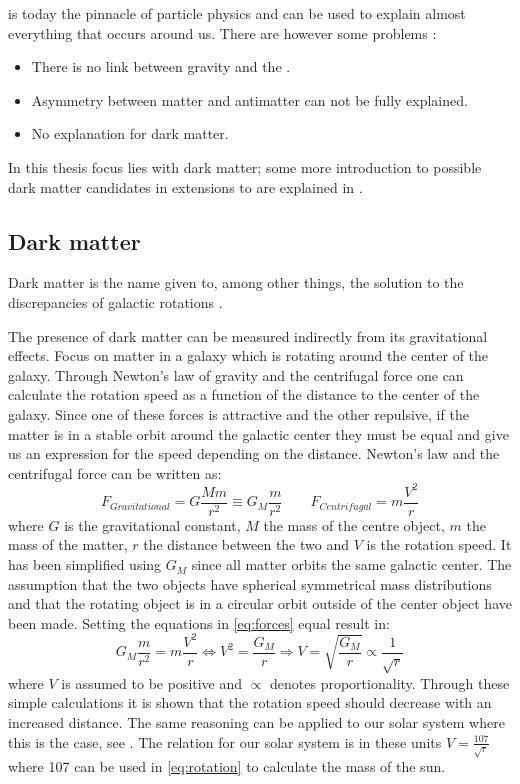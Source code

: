 \abbrSM is today the pinnacle of particle physics and can be used to explain almost everything that occurs around us. There are however some problems \citep{Jungman:1996}:
\begin{itemize}
\item There is no link between gravity and the \abbrSM.
\item Asymmetry between matter and antimatter can not be fully explained.
\item No explanation for dark matter.
\end{itemize} 
In this thesis focus lies with dark matter; some more introduction to possible dark matter candidates in extensions to \abbrSM are explained in .


\subsection{Dark matter}\label{sec:tb:subsec:dark}
Dark matter is the name given to, among other things, the solution to the discrepancies of galactic rotations \citep{darkmatter}.

The presence of dark matter can be measured indirectly from its gravitational effects. Focus on matter in a galaxy which is rotating around the center of the galaxy. Through Newton's law of gravity and the centrifugal force one can calculate the rotation speed as a function of the distance to the center of the galaxy. Since one of these forces is attractive and the other repulsive, if the matter is in a stable orbit around the galactic center they must be equal and give us an expression for the speed depending on the distance. Newton's law and the centrifugal force can be written as:
\begin{equation}\label{eq:forces}
F_{Gravitational}=G \frac{M m}{r^2} \equiv G_M \frac{m}{r^2} \qquad F_{Centrifugal} = m\frac{V^2}{r}
\end{equation}
where $G$ is the gravitational constant, $M$ the mass of the centre object, $m$ the mass of the matter, $r$ the distance between the two and $V$ is the rotation speed. It has been simplified using $G_M$ since all matter orbits the same galactic center. The assumption that the two objects have spherical symmetrical mass distributions and that the rotating object is in a circular orbit outside of the center object have been made. Setting the equations in \eqref{eq:forces} equal result in:
\begin{equation}\label{eq:rotation}
G_M \frac{m}{r^2} = m\frac{V^2}{r} \Leftrightarrow V^2 =\frac{G_M}{r} \Rightarrow V=\sqrt{\frac{G_M}{r}} \propto \frac{1}{\sqrt{r}}
\end{equation}
where $V$ is assumed to be positive and $\propto$ denotes proportionality. Through these simple calculations it is shown that the rotation speed should decrease with an increased distance. The same reasoning can be applied to our solar system where this is the case, see . The relation for our solar system is in these units $V=\frac{107}{\sqrt{r}}$ where 107 can be used in \eqref{eq:rotation} to calculate the mass of the sun.

